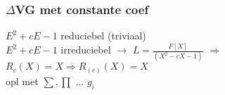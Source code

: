 \documentclass[20pt]{beamer}
\begin{document}

\begin{frame}
    \frametitle{$\Delta$VG met constante coef }
    $E^2+cE-1$ reduciebel (triviaal) \\ \pause
    $E^2+cE-1$ irreduciebel \pause $\rightarrow$ $L = \frac{F[X]}{(X^2-cX-1)}$ \pause $\Rightarrow$\\ 
    $R_c(X)=X \Rightarrow R_{(c)}(X)=X$ \\ \pause
    opl met $\sum,\prod$ ... $g_i$ \\ \pause
\end{frame}



\end{document}
